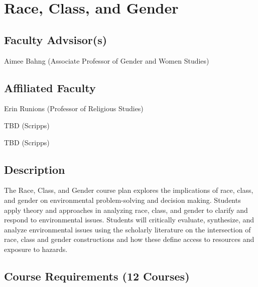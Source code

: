 \documentclass{article}\usepackage[]{graphicx}\usepackage[]{xcolor}
\newenvironment{itemize*}%
  {\begin{itemize}%
    \setlength{\itemsep}{0pt}%
    \setlength{\parskip}{0pt}}%
  {\end{itemize}}
\begin{document}
\newpage %
\section{Race, Class, and Gender}



\subsection{Faculty Advsisor(s)}

\begin{itemize*}
  \item Aimee Bahng (Associate Professor of Gender and Women Studies)
\end{itemize*}

\subsection{Affiliated Faculty}

\begin{itemize*}
  \item Erin Runions (Professor of Religious Studies)
  \item TBD (Scripps)
  \item TBD (Scripps)
\end{itemize*}

\subsection{Description}

The Race, Class, and Gender course plan explores the implications of race, class, and gender on environmental problem-solving and decision making. Students apply theory and approaches in analyzing race, class, and gender to clarify and respond to environmental issues. Students will critically evaluate, synthesize, and analyze environmental issues using the scholarly literature on the intersection of race, class and gender constructions and how these define access to resources and exposure to hazards.

\subsection{Course Requirements (12 Courses)}
\end{document}
